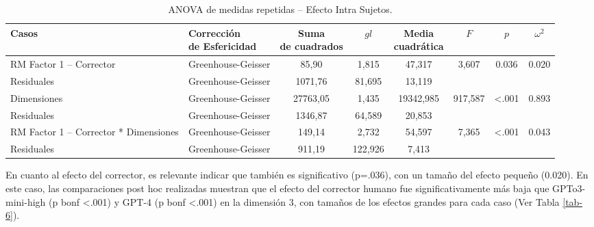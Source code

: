 \documentclass[spanish]{textolivre}
\begin{document}
\begin{table}[h!]
\centering
\small
\begin{threeparttable}
\caption{ANOVA de medidas repetidas -- Efecto Intra Sujetos.}\label{tab-5}
\small
\begin{tabular}{p{2.5cm} p{2cm} c c c c c c}
\toprule
Casos & \shortstack{Corrección \\ de Esfericidad} & \shortstack{Suma \\ de cuadrados} & $gl$ & \shortstack{Media \\ cuadrática} & $F$ & $p$ & $\omega^2$ \\
\midrule
RM Factor 1 -- Cor\-rector & Greenhouse-Geisser & 85,90 & 1,815 & 47,317 & 3,607 & 0.036 & 0.020 \\
Residuales & Greenhouse-Geisser & 1071,76 & 81,695 & 13,119 & & & \\

Dimensiones & Greenhouse-Geisser & 27763,05 & 1,435 & 19342,985 & 917,587 & <.001 & 0.893 \\
Residuales & Greenhouse-Geisser & 1346,87 & 64,589 & 20,853 & & & \\

RM Factor 1 -- Cor\-rector * Dimensiones & Greenhouse-Geisser & 149,14 & 2,732 & 54,597 & 7,365 & <.001 & 0.043 \\
Residuales & Greenhouse-Geisser & 911,19 & 122,926 & 7,413 & & & \\
\bottomrule
\end{tabular}
\end{threeparttable}
\end{table}

En cuanto al efecto del corrector, es relevante indicar que también es significativo (p=.036), con un tamaño del efecto pequeño (0.020). En este caso, las comparaciones post hoc realizadas muestran que el efecto del corrector humano fue significativamente más baja que GPTo3-mini-high (p bonf <.001) y GPT-4 (p bonf <.001) en la dimensión 3, con tamaños de los efectos grandes para cada caso (Ver Tabla \ref{tab-6}).
\end{document}
